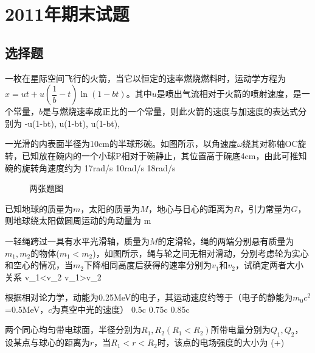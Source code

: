 \chapter{2011年期末试题}
\section{选择题}
一枚在星际空间飞行的火箭，当它以恒定的速率燃烧燃料时，运动学方程为$x=ut+u(\dfrac{1}{b}-t)\ln(1-bt)$。其中$u$是喷出气流相对于火箭的喷射速度，是一个常量，$b$是与燃烧速率成正比的一个常量，则此火箭的速度与加速度的表达式分别为
{-u\ln(1-bt),}
{u\ln(1-bt),}
{u\ln(1-bt),}

一光滑的内表面半径为10cm的半球形碗。如图所示，以角速度$\omega$绕其对称轴OC旋转，已知放在碗内的一个小球P相对于碗静止，其位置高于碗底4cm，由此可推知碗的旋转角速度约为
{17\textrm{rad/s}}
{10\textrm{rad/s}}
{18\textrm{rad/s}}

\begin{figure}[!h]
	\centering
	\quad
	\caption{两张题图}
\end{figure}

已知地球的质量为$m$，太阳的质量为$M$，地心与日心的距离为$R$，引力常量为$G$，则地球绕太阳做圆周运动的角动量为
{}
{m}
{}

一轻绳跨过一具有水平光滑轴，质量为$M$的定滑轮，绳的两端分别悬有质量为$m_1,m_2$的物体($m_1<m_2$)，如图所示，绳与轮之间无相对滑动，分别考虑轮为实心和空心的情况，当$m_2$下降相同高度后获得的速率分别为$v_1$和$v_2$，试确定两者大小关系
{v_1<v_2}
{v_1>v_2}
{}

根据相对论力学，动能为0.25MeV的电子，其运动速度约等于（电子的静能为$m_0c^2$=0.5MeV，$c$为真空中光的速度）
{0.5c}
{0.75c}
{0.85c}

两个同心均匀带电球面，半径分别为$R_1,R_2(R_1<R_2)$所带电量分别为$Q_1,Q_2$，设某点与球心的距离为$r$，当$R_1<r<R_2$时，该点的电场强度的大小为
{}
{(+)}
{}

